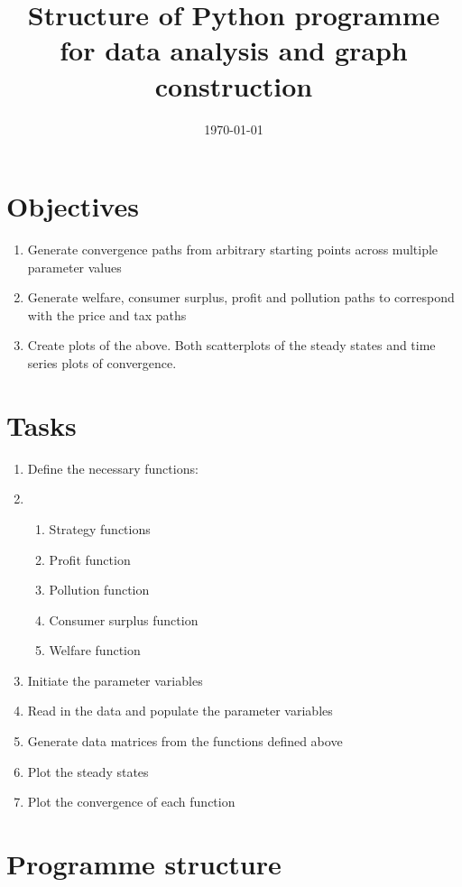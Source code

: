 \documentclass{amsart}
\title{Structure of Python programme for data analysis and graph construction}
\date{\today}
\begin{document}
\maketitle
\section{Objectives}
\label{sec:objectives}

\begin{enumerate}
\item Generate convergence paths from arbitrary starting points across
  multiple parameter values
\item Generate welfare, consumer surplus, profit and pollution paths
  to correspond with the price and tax paths
\item Create plots of the above. Both scatterplots of the steady
  states and time series plots of convergence.
\end{enumerate}

\section{Tasks}
\label{sec:tasks}

\begin{enumerate}
\item Define the necessary functions:
\item
  \begin{enumerate}
  \item Strategy functions
  \item Profit function
  \item Pollution function
  \item Consumer surplus function
  \item Welfare function
  \end{enumerate}
\item Initiate the parameter variables
\item Read in the data and populate the parameter variables
\item Generate data matrices from the functions defined above
\item Plot the steady states
\item Plot the convergence of each function
\end{enumerate}

\section{Programme structure}
\label{sec:programme-structure}
\end{document}
